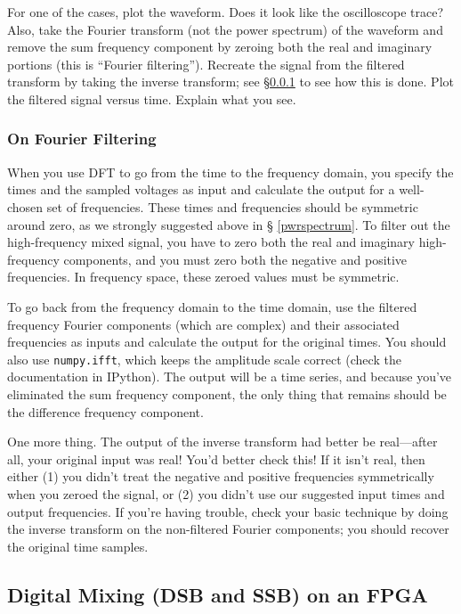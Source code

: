 \documentclass[11pt]{article}
\begin{document}
For one of the cases, plot the waveform.  Does it look like the
oscilloscope trace? Also, take the Fourier transform (not the power
spectrum) of the waveform and remove the sum frequency component by
zeroing both the real and imaginary portions (this is ``Fourier
filtering'').  Recreate the signal from the filtered transform by taking
the inverse transform; see \S \ref{fourierfilter} to see how this is
done. Plot the filtered signal versus time.  Explain what you see.

\subsubsection {On  Fourier Filtering} \label{fourierfilter}

When you use DFT to go from the time to the frequency domain, you
specify the times and the sampled voltages as input and calculate the
output for a well-chosen set of frequencies.  These times and
frequencies should be symmetric around zero, as we strongly suggested above in \S
\ref{pwrspectrum}.  To filter out the high-frequency mixed signal, you
have to zero both the real and imaginary high-frequency components,
and you must zero both the negative and positive frequencies. In
frequency space, these zeroed values must be symmetric.

To go back from the frequency domain to the time domain, use the 
  filtered frequency Fourier components (which are complex) and their associated frequencies
  as inputs and calculate the output for the original times.
  You should also use {\tt numpy.ifft}, which keeps the
  amplitude scale correct (check the documentation in IPython).
  The output will be a time series, and because you've
  eliminated the sum frequency component, the only thing that remains
  should be the difference frequency component.

One more thing. The output of the inverse transform had better be
real---after all, your original input was real! You'd better check this!
If it isn't real, then either (1) you didn't treat the negative and positive
frequencies symmetrically when you zeroed the signal, or (2) you didn't
use our suggested input times and output frequencies. If you're having
trouble, check your basic technique by doing the inverse transform on
the non-filtered Fourier components; you should recover the original
time samples.

\subsection{Digital Mixing (DSB and SSB) on an FPGA} \label{digital_mixing}
\end{document}
